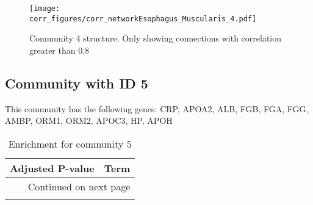\begin{figure}[h!]
\centering
\texttt{[image: corr\_figures/corr\_networkEsophagus\_Muscularis\_4.pdf]}
\caption{Community 4 structure. Only showing connections with correlation greater than 0.8}
\end{figure}




\subsection*{Community with ID 5}
This community has the following genes: CRP, APOA2, ALB, FGB, FGA, FGG, AMBP, ORM1, ORM2, APOC3, HP, APOH
\\
\begin{longtable}{p{2.4cm}p{14.5cm}}
\caption{Enrichment for community 5}\\
\toprule
Adjusted \newline P-value &                                                                                          Term \\
\midrule
\endhead
\midrule
\multicolumn{2}{r}{{Continued on next page}} \\
\midrule
\endfoot


\end{longtable}
